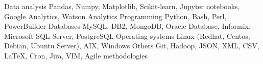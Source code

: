 %
%
%

    \begin{keywords}
        \keywordsentry
            {Data analysis}
            {
                Pandas,
                Numpy,
                Matplotlib,
                Scikit-learn,
                Jupyter notebooks,
                Google Analytics,
                Watson Analytics
            }
        \keywordsentry
            {Programming}
            {
                Python,
                Bash,
                Perl,
                PowerBuilder
            }
        \keywordsentry
            {Databases}
            {
                MySQL,
                DB2,
                MongoDB,
                Oracle Database, 
                Informix,
                Microsoft SQL Server,
                PostgreSQL
            }
        \keywordsentry
            {Operating systems}
            {
                Linux (Redhat, Centos, Debian, Ubuntu Server),
                AIX,
                Windows
            }
        \keywordsentry
            {Others}
            {
                Git,
                Hadoop,
                JSON,
                XML,
                CSV,
                \LaTeX,
                Cron,
                Jira,
                VIM,
                Agile methodologies
            }
    \end{keywords}

